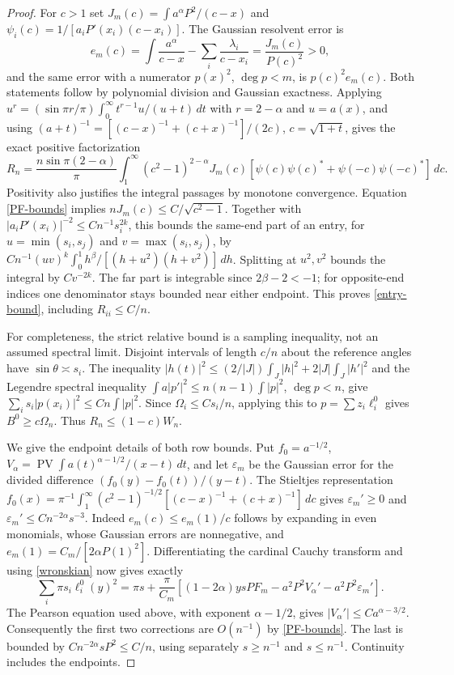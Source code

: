 \documentclass[a4paper,11pt]{amsart}
\theoremstyle{remark}\newtheorem{remark}[theorem]{Remark}
\newcommand{\PV}{\operatorname{PV}}
\newcommand{\dd}{\,d}
\begin{document}
\begin{proof}
For $c>1$ set
$J_m(c)=\int a^\alpha P^2/(c-x)$ and
$\psi_i(c)=1/[a_iP'(x_i)(c-x_i)]$.
The Gaussian resolvent error is
\begin{equation}\label{resolvent}
 e_m(c)=\int\frac{a^\alpha}{c-x}-\sum_i\frac{\lambda_i}{c-x_i}
 =\frac{J_m(c)}{P(c)^2}>0,
\end{equation}
and the same error with a numerator $p(x)^2$, $\deg p<m$, is
$p(c)^2e_m(c)$. Both statements follow by polynomial division and
Gaussian exactness. Applying
$u^r=(\sin\pi r/\pi)\int_0^\infty t^{r-1}u/(u+t)\dd t$
with $r=2-\alpha$ and $u=a(x)$, and using
$(a+t)^{-1}=[(c-x)^{-1}+(c+x)^{-1}]/(2c)$,
$c=\sqrt{1+t}$, gives the exact positive factorization
\begin{equation}\label{factorization}
 R_n=\frac{n\sin\pi(2-\alpha)}\pi\int_1^\infty
 (c^2-1)^{2-\alpha}J_m(c)
 [\psi(c)\psi(c)^*+\psi(-c)\psi(-c)^*]\dd c.
\end{equation}
Positivity also justifies the integral passages by monotone convergence.
Equation \eqref{PF-bounds} implies
$nJ_m(c)\le C/\sqrt{c^2-1}$.
Together with $|a_iP'(x_i)|^{-2}\le Cn^{-1}s_i^{2k}$, this bounds the
same-end part of an entry, for $u=\min(s_i,s_j)$ and
$v=\max(s_i,s_j)$, by
$Cn^{-1}(uv)^k\int_0^1 h^\beta/[(h+u^2)(h+v^2)]\dd h$.
Splitting at $u^2,v^2$ bounds the integral by $Cv^{-2k}$.
The far part is integrable since $2\beta-2<-1$; for opposite-end
indices one denominator stays bounded near either endpoint.
This proves \eqref{entry-bound}, including $R_{ii}\le C/n$.

For completeness, the strict relative bound is a sampling inequality,
not an assumed spectral limit. Disjoint intervals of length $c/n$
about the reference angles have $\sin\theta\asymp s_i$.
The inequality $|h(t)|^2\le(2/|J|)\int_J|h|^2+2|J|\int_J|h'|^2$
and the Legendre spectral inequality
$\int a|p'|^2\le n(n-1)\int|p|^2$, $\deg p<n$, give
$\sum_i s_i|p(x_i)|^2\le Cn\int|p|^2$.
Since $\Omega_i\le Cs_i/n$, applying this to
$p=\sum z_i\ell_i^0$ gives $B^0\ge c\Omega_n$.
Thus $R_n\le(1-c)W_n$.

We give the endpoint details of both row bounds. Put $f_0=a^{-1/2}$,
$V_\alpha=\PV\int a(t)^{\alpha-1/2}/(x-t)\dd t$, and let
$\varepsilon_m$ be the Gaussian error for the divided difference
$(f_0(y)-f_0(t))/(y-t)$. The Stieltjes representation
$f_0(x)=\pi^{-1}\int_1^\infty(c^2-1)^{-1/2}
 [(c-x)^{-1}+(c+x)^{-1}]\dd c$ gives
$\varepsilon_m'\ge0$ and
$\varepsilon_m'\le Cn^{-2\alpha}s^{-3}$.
Indeed $e_m(c)\le e_m(1)/c$ follows by expanding in even monomials,
whose Gaussian errors are nonnegative, and
$e_m(1)=C_m/[2\alpha P(1)^2]$.
Differentiating the cardinal Cauchy transform and using
\eqref{wronskian} now gives exactly
\begin{equation}\label{weighted-row-exact}
 \sum_i\pi s_i\ell_i^0(y)^2
 =\pi s+\frac\pi{C_m}
 [(1-2\alpha)ysPF_m-a^2P^2V_\alpha'-a^2P^2\varepsilon_m'].
\end{equation}
The Pearson equation used above, with exponent $\alpha-1/2$, gives
$|V_\alpha'|\le Ca^{\alpha-3/2}$.
Consequently the first two corrections are $O(n^{-1})$ by
\eqref{PF-bounds}. The last is bounded by
$Cn^{-2\alpha}sP^2\le C/n$, using separately $s\ge n^{-1}$ and
$s\le n^{-1}$. Continuity includes the endpoints.


\end{proof}
\end{document}
